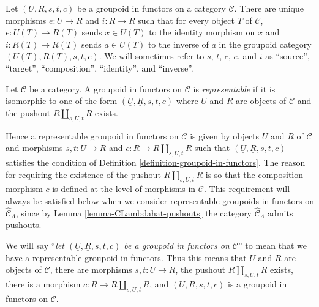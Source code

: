 \begin{remark}
\label{remark-identity-inverse}
Let $(U, R, s, t, c)$ be a groupoid in functors on a category $\mathcal{C}$.
There are unique morphisms $e : U \to R$ and $i : R \to R$ such that
for every object $T$ of $\mathcal{C}$, $e: U(T) \to R(T)$ sends
$x \in U(T)$ to the identity morphism on $x$ and $i: R(T) \to R(T)$ sends
$a \in U(T)$ to the inverse of $a$ in the groupoid category
$(U(T), R(T), s, t, c)$. We will sometimes refer to $s$, $t$, $c$, $e$,
and $i$ as ``source'', ``target'', ``composition'', ``identity'', and
``inverse''.
\end{remark}

\begin{definition}
\label{definition-representable}
Let $\mathcal{C}$ be a category. A groupoid in functors on $\mathcal{C}$ is
{\it representable} if it is isomorphic to one of the form
$(\underline{U}, \underline{R}, s, t, c)$ where $U$ and $R$ are objects of
$\mathcal{C}$ and the pushout $R \amalg_{s, U, t} R$ exists.
\end{definition}

\begin{remark}
\label{remark-reason-existence-coproduct}
Hence a representable groupoid in functors on $\mathcal{C}$ is given by
objects $U$ and $R$ of $\mathcal{C}$ and morphisms $s, t : U \to R$ and
$c : R \to R \amalg_{s, U, t} R$ such that
$(\underline{U}, \underline{R}, s, t, c)$ satisfies the condition of
Definition \ref{definition-groupoid-in-functors}. The reason for requiring
the existence of the pushout $R \coprod_{s, U, t} R$ is so that the composition
morphism $c$ is defined at the level of morphisms in $\mathcal{C}$.
This requirement will always be satisfied below when we consider
representable groupoids in functors on
$\widehat{\mathcal{C}}_\Lambda$, since by
Lemma \ref{lemma-CLambdahat-pushouts}
the category $\widehat{\mathcal{C}}_\Lambda$ admits pushouts.
\end{remark}

\begin{remark}
\label{remark-simplify-terminology}
We will say ``{\it let $(\underline{U}, \underline{R}, s, t, c)$ be a
groupoid in functors on $\mathcal{C}$}'' to mean that we have
a representable groupoid in functors. Thus this means that
$U$ and $R$ are objects of $\mathcal{C}$, there are morphisms
$s, t : U \to R$, the pushout $R \amalg_{s, U, t} R$ exists,
there is a morphism $c : R \to R \amalg_{s, U, t} R$, and
$(\underline{U}, \underline{R}, s, t, c)$ is a
groupoid in functors on $\mathcal{C}$.
\end{remark}


